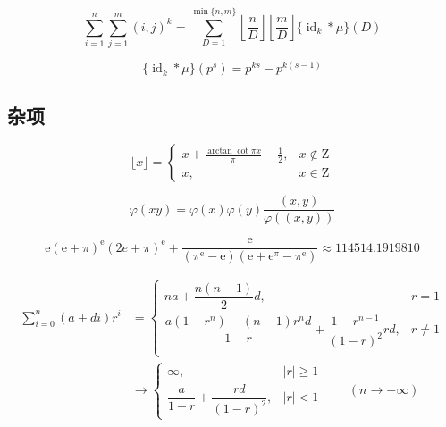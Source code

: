 \begin{equation}
    \sum_{i=1}^n\sum_{j=1}^m(i,j)^k=\sum_{D=1}^{\min\{n,m\}}\left\lfloor\frac{n}{D}\right\rfloor\left\lfloor\frac{m}{D}\right\rfloor\{\operatorname{id}_k*\mu\}(D)
\end{equation}

\begin{equation}
    \{\operatorname{id}_k*\mu\}(p^s)=p^{ks}-p^{k(s-1)}
\end{equation}

\subsection{杂项}

\begin{equation}
    \lfloor x\rfloor=\begin{cases}
        \displaystyle x+\frac{\arctan\cot\pi x}{\pi}-\frac{1}{2}, & x\notin\mathrm{Z} \\
        x,                                                        & x\in\mathrm{Z}
    \end{cases}
\end{equation}

\begin{equation}
    \varphi(xy)=\varphi(x)\varphi(y)\frac{(x,y)}{\varphi((x,y))}
\end{equation}

\begin{equation}
    \mathrm{e}(\mathrm{e}+\pi)^\mathrm{e}(2e + \pi)^\mathrm{e}+\frac{\mathrm{e}}{(\pi^\mathrm{e}-\mathrm{e})(\mathrm{e}+\mathrm{e}^\pi-\pi^\mathrm{e})}\approx 114514.1919810
\end{equation}

\begin{equation}
    \begin{aligned}
        \sum_{i=0}^n(a+di)r^i & =\begin{cases}
                                     na+\dfrac{n(n-1)}{2}d,                                        & r=1    \\
                                     \dfrac{a(1-r^n)-(n-1)r^nd}{1-r}+\dfrac{1-r^{n-1}}{(1-r)^2}rd, & r\ne 1 \\
                                 \end{cases} \\
                              & \to\begin{cases}
                                       \infty,                             & |r|\geq 1 \\
                                       \dfrac{a}{1-r}+\dfrac{rd}{(1-r)^2}, & |r|<1
                                   \end{cases}\qquad(n\to+\infty)
    \end{aligned}
\end{equation}
